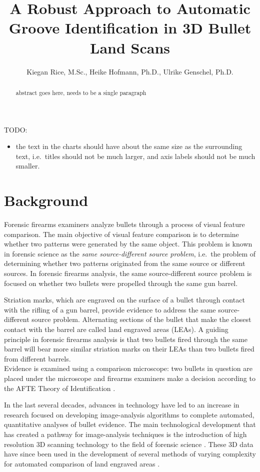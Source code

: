 \documentclass[]{article}
\title{A Robust Approach to Automatic Groove Identification in 3D Bullet Land
Scans}
\author{Kiegan Rice, M.Sc., Heike Hofmann, Ph.D., Ulrike Genschel, Ph.D.}
\date{}
\providecommand{\tightlist}{%
  \setlength{\itemsep}{0pt}\setlength{\parskip}{0pt}}
\begin{document}
\maketitle
\begin{abstract}
abstract goes here, needs to be a single paragraph
\end{abstract}

TODO:

\begin{itemize}
\tightlist
\item
  the text in the charts should have about the same size as the
  surrounding text, i.e.~titles should not be much larger, and axis
  labels should not be much smaller.
\end{itemize}

\section{Background}

Forensic firearms examiners analyze bullets through a process of visual
feature comparison. The main objective of visual feature comparison is
to determine whether two patterns were generated by the same object.
This problem is known in forensic science as the \emph{same
source-different source problem}, i.e.~the problem of determining
whether two patterns originated from the same source or different
sources. In forensic firearms analysis, the same source-different source
problem is focused on whether two bullets were propelled through the
same gun barrel.

Striation marks, which are engraved on the surface of a bullet through
contact with the rifling of a gun barrel, provide evidence to address
the same source-different source problem. Alternating sections of the
bullet that make the closest contact with the barrel are called land
engraved areas (LEAs). A guiding principle in forensic firearms analysis
is that two bullets fired through the same barrel will bear more similar
striation marks on their LEAs than two bullets fired from different
barrels.\\
Evidence is examined using a comparison microscope: two bullets in
question are placed under the microscope and firearms examiners make a
decision according to the AFTE Theory of Identification \citep{AFTE}.

In the last several decades, advances in technology have led to an
increase in research focused on developing image-analysis algorithms to
complete automated, quantitative analyses of bullet evidence. The main
technological development that has created a pathway for image-analysis
techniques is the introduction of high resolution 3D scanning technology
to the field of forensic science
\citep[e.g.][]{DeKinder1, DeKinder2, Bachrach1}. These 3D data have
since been used in the development of several methods of varying
complexity for automated comparison of land engraved areas
\citep[e.g.][]{Ma1, Chu1, Chu2, Hare1}.
\end{document}
